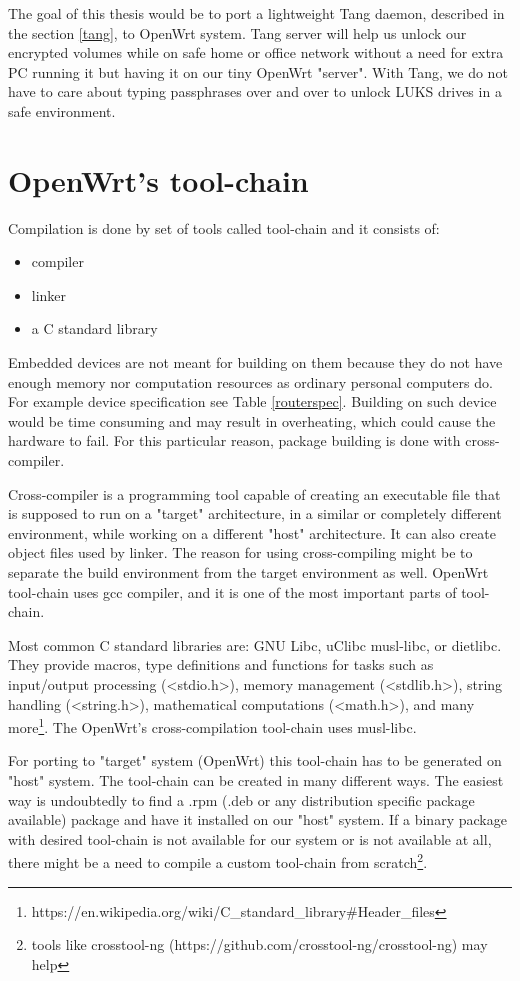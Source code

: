 The goal of this thesis would be to port a lightweight Tang daemon, described in the section \ref{tang}, to OpenWrt system.
Tang server will help us unlock our encrypted volumes while on safe home or office network without a need for extra PC running it but having it on our tiny OpenWrt "server".
With Tang, we do not have to care about typing passphrases over and over to unlock LUKS drives in a safe environment.



\section{OpenWrt's tool-chain}

Compilation is done by set of tools called tool-chain and it consists of:
\begin{itemize}
    \item compiler
    \item linker
    \item a C standard library
\end{itemize}

Embedded devices are not meant for building on them because they do not have enough memory nor computation resources as ordinary personal computers do.
For example device specification see Table \ref{routerspec}.
Building on such device would be time consuming and may result in overheating, which could cause the hardware to fail.
For this particular reason, package building is done with cross-compiler.

Cross-compiler is a programming tool capable of creating an executable file that is supposed to run on a "target" architecture, in a similar or completely different environment, while working on a different "host" architecture.
It can also create object files used by linker.
The reason for using cross-compiling might be to separate the build environment from the target environment as well.
OpenWrt tool-chain uses gcc compiler, and it is one of the most important parts of tool-chain.

Most common C standard libraries are: GNU Libc, uClibc musl-libc, or dietlibc.
They provide macros, type definitions and functions for tasks such as input/output processing (<stdio.h>), memory management (<stdlib.h>), string handling (<string.h>), mathematical computations (<math.h>), and many more\footnote{https://en.wikipedia.org/wiki/C\_standard\_library\#Header\_files}.
The OpenWrt's cross-compilation tool-chain uses musl-libc.

For porting to "target" system (OpenWrt) this tool-chain has to be generated on "host" system.
The tool-chain can be created in many different ways.
The easiest way is undoubtedly to find a .rpm (.deb or any distribution specific package available) package and have it installed on our "host" system.
If a binary package with desired tool-chain is not available for our system or is not available at all, there might be a need to compile a custom tool-chain from scratch\footnote{tools like crosstool-ng (https://github.com/crosstool-ng/crosstool-ng) may help}.

